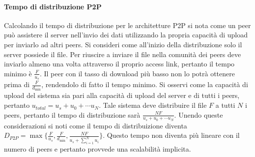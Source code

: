 \paragraph{Tempo di distribuzione P2P}
Calcolando il tempo di distribuzione per le architetture P2P si nota come un peer pu\`o assistere il server nell'invio dei dati utilizzando la propria 
capacit\`a di upload per inviarlo ad altri peers. Si consideri come all'inizio della distribuzione solo il server possiede il file. Per riuscire a inviare 
il file nella comunit\`a dei peers deve inviarlo almeno una volta attraverso il proprio access link, pertanto il tempo minimo \`e $\frac{F}{u_s}$. Il peer
con il tasso di download pi\`u basso non lo potr\`a ottenere prima di $\frac{F}{d_{\min}}$, rendendolo di fatto il tempo minimo. Si osservi come la 
capacit\`a di upload del sistema sia pari alla capacit\`a di upload del server e di tutti i peers, pertanto $u_{total}=u_s+u_0+\cdots u_N$. Tale sistema 
deve distribuire il file $F$ a tutti $N$ i peers, pertanto il tempo di distribuzione sar\`a $\frac{NF}{u_s+u_0+\cdots u_N}$. Unendo queste considerazioni si 
noti come il tempo di distribuizione diventa $D_{P2P}=\max\{\frac{F}{u_s}, \frac{F}{d_{\min}}, \frac{NF}{u_s+\sum\limits_{i=1}^Nu_i}\}$. Questo tempo non 
diventa pi\`u lineare con il numero di peers e pertanto provvede una scalabilit\`a implicita.
